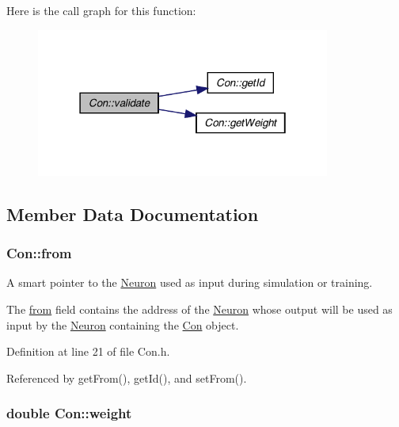 Here is the call graph for this function:
\nopagebreak
\begin{figure}[H]
\begin{center}
\leavevmode
\includegraphics[width=274pt]{class_con_af5f836a7b0988b3d9113589b2959d5e6_cgraph}
\end{center}
\end{figure}




\subsection{Member Data Documentation}
\hypertarget{class_con_a7c05f90dff56fd26c1fa0f042bba67a6}{
\subsubsection[{from}]{ {\bf Con::from}}}
\label{class_con_a7c05f90dff56fd26c1fa0f042bba67a6}


A smart pointer to the \hyperlink{class_neuron}{Neuron} used as input during simulation or training. 

The \hyperlink{class_con_a7c05f90dff56fd26c1fa0f042bba67a6}{from} field contains the address of the \hyperlink{class_neuron}{Neuron} whose output will be used as input by the \hyperlink{class_neuron}{Neuron} containing the \hyperlink{class_con}{Con} object. 

Definition at line 21 of file Con.h.



Referenced by getFrom(), getId(), and setFrom().

\hypertarget{class_con_a7f46485ba5b41971ea38641f9e7d1be0}{
\subsubsection[{weight}]{\setlength{\rightskip}{0pt plus 5cm}double {\bf Con::weight}}}
\label{class_con_a7f46485ba5b41971ea38641f9e7d1be0}


